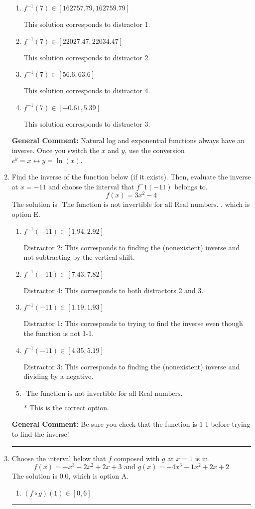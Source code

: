 \documentclass{extbook}[14pt]
\newcommand{\litem}[1]{\item #1

\rule{\textwidth}{0.4pt}}
\begin{document}
\begin{enumerate}
{\begin{enumerate}[label=\Alph*.]
 This is the solution.
\item \( f^{-1}(7) \in [162757.79, 162759.79] \)

 This solution corresponds to distractor 1.
\item \( f^{-1}(7) \in [22027.47, 22034.47] \)

 This solution corresponds to distractor 2.
\item \( f^{-1}(7) \in [56.6, 63.6] \)

 This solution corresponds to distractor 4.
\item \( f^{-1}(7) \in [-0.61, 5.39] \)

 This solution corresponds to distractor 3.
\end{enumerate}

\textbf{General Comment:} Natural log and exponential functions always have an inverse. Once you switch the $x$ and $y$, use the conversion $ e^y = x \leftrightarrow y=\ln(x)$.
}
\litem{
Find the inverse of the function below (if it exists). Then, evaluate the inverse at $x = -11$ and choose the interval that $f^-1(-11)$ belongs to.
\[ f(x) = 3 x^2 - 4 \]The solution is \( \text{ The function is not invertible for all Real numbers. } \), which is option E.\begin{enumerate}[label=\Alph*.]
\item \( f^{-1}(-11) \in [1.94, 2.92] \)

 Distractor 2: This corresponds to finding the (nonexistent) inverse and not subtracting by the vertical shift.
\item \( f^{-1}(-11) \in [7.43, 7.82] \)

 Distractor 4: This corresponds to both distractors 2 and 3.
\item \( f^{-1}(-11) \in [1.19, 1.93] \)

 Distractor 1: This corresponds to trying to find the inverse even though the function is not 1-1. 
\item \( f^{-1}(-11) \in [4.35, 5.19] \)

 Distractor 3: This corresponds to finding the (nonexistent) inverse and dividing by a negative.
\item \( \text{ The function is not invertible for all Real numbers. } \)

* This is the correct option.
\end{enumerate}

\textbf{General Comment:} Be sure you check that the function is 1-1 before trying to find the inverse!
}
\litem{
Choose the interval below that $f$ composed with $g$ at $x=1$ is in.
\[ f(x) = -x^{3} -2 x^{2} +2 x + 3 \text{ and } g(x) = -4x^{3} -1 x^{2} +2 x + 2 \]The solution is \( 0.0 \), which is option A.\begin{enumerate}[label=\Alph*.]
\item \( (f \circ g)(1) \in [0, 6] \)


\end{enumerate}}
\end{enumerate}
\end{document}
